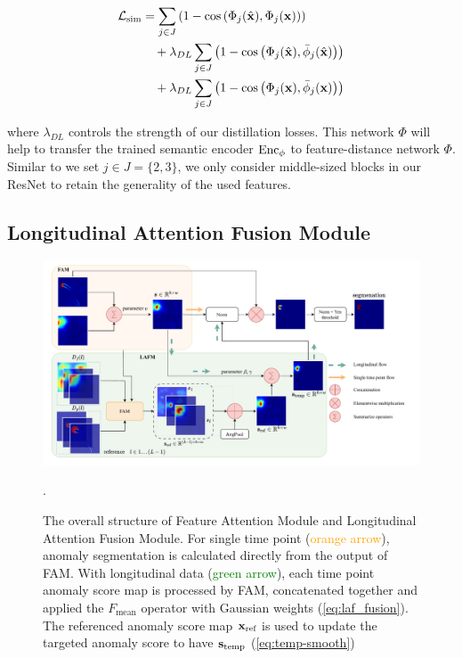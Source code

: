 \begin{align}
{\mathcal{L}}_{\textnormal{sim}} &= \sum_{j \in J} \left( 1 - \cos\left(\Phi_j(\hat{{\mathbf{x}}}), \Phi_j({\mathbf{x}})\right) \right) \notag \\
&\quad + \lambda_{DL} \sum_{j \in J} \left( 1 - \cos\left(\Phi_j(\hat{{\mathbf{x}}}), \bar{\phi}_j(\hat{{\mathbf{x}}})\right) \right) \notag \\
&\quad + \lambda_{DL} \sum_{j \in J} \left( 1 - \cos\left(\Phi_j({\mathbf{x}}), \bar{\phi}_j({\mathbf{x}})\right) \right) \label{eq:fe-dl-loss}
\end{align}

where $\lambda_{DL}$ controls the strength of our distillation losses. This network $\Phi$ will help to transfer the trained semantic encoder $\textnormal{Enc}_{\phi}$ to feature-distance network $\Phi$. Similar to \cite{DDAD, PatchCoretotalrecall} we set $j \in J = \{2, 3\}$, we only consider middle-sized blocks in our ResNet to retain the generality of the used features.

\subsection{Longitudinal Attention Fusion Module}
\label{sec:method-lafm}

\begin{figure}[htbp]
    \centering
    \includegraphics[width=0.95\linewidth]{figures/model-fam-lafm.pdf}
    \caption[Overview of FAM and LAFM module]{The overall structure of Feature Attention Module and Longitudinal Attention Fusion Module. For single time point (\textcolor{orange}{orange arrow}), anomaly segmentation is calculated directly from the output of FAM. With longitudinal data (\textcolor{green}{green arrow}), each time point anomaly score map is processed by FAM, concatenated together and applied the $F_{\text{mean}}$ operator with Gaussian weights (\cref{eq:laf_fusion}). The referenced anomaly score map ${\mathbf{x}}_{\text{ref}}$ is used to update the targeted anomaly score to have ${\mathbf{s}}_{\text{temp}}$ (\cref{eq:temp-smooth})}. 
    \label{fig:model-fam-lafm}
\end{figure}

